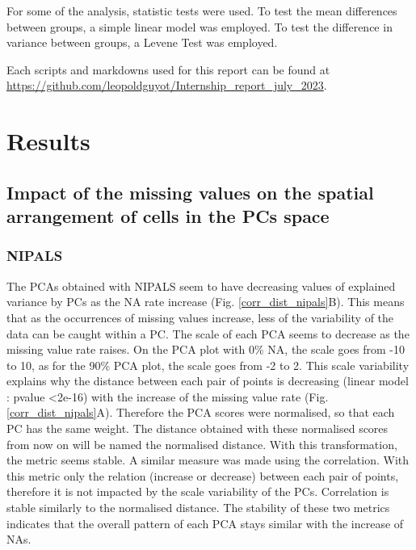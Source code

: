 \documentclass[a4paper, 11pt, twocolumn]{article}
\begin{document}
For some of the analysis, statistic tests were used. To test the mean differences between groups, a simple linear model was employed. To test the difference in variance between groups, a Levene Test \citep{car} was employed.

Each scripts and markdowns used for this report can be found at \url{https://github.com/leopoldguyot/Internship_report_july_2023}.





\section{Results}

\subsection{Impact of the missing values on the spatial arrangement of cells in the PCs space}

\subsubsection*{NIPALS}

The PCAs obtained with NIPALS seem to have decreasing values of explained variance by PCs as the NA rate increase (Fig. \ref{corr_dist_nipals}B). This means that as the occurrences of missing values increase, less of the variability of the data can be caught within a PC. The scale of each PCA seems to decrease as the missing value rate raises. On the PCA plot with 0\% NA, the scale goes from -10 to 10, as for the 90\% PCA plot, the scale goes from -2 to 2. This scale variability explains why the distance between each pair of points is decreasing (linear model : pvalue <2e-16) with the increase of the missing value rate (Fig. \ref{corr_dist_nipals}A). Therefore the PCA scores were normalised, so that each PC has the same weight. The distance obtained with these normalised scores from now on will be named the normalised distance. With this transformation, the metric seems stable. A similar measure was made using the correlation. With this metric only the relation (increase or decrease) between each pair of points, therefore it is not impacted by the scale variability of the PCs. Correlation is stable similarly to the normalised distance. The stability of these two metrics indicates that the overall pattern of each PCA stays similar with the increase of NAs. 
\end{document}
